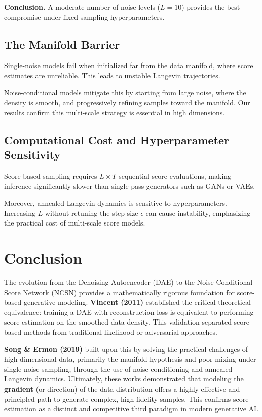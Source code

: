 \documentclass[11pt,a4paper]{article}
\begin{document}
\textbf{Conclusion.}
A moderate number of noise levels ($L=10$) provides the best compromise under fixed sampling hyperparameters.

\subsection{The Manifold Barrier}

Single-noise models fail when initialized far from the data manifold, where score estimates are unreliable.
This leads to unstable Langevin trajectories.

Noise-conditional models mitigate this by starting from large noise, where the density is smooth, and progressively refining samples toward the manifold.
Our results confirm this multi-scale strategy is essential in high dimensions.

\subsection{Computational Cost and Hyperparameter Sensitivity}

Score-based sampling requires $L\times T$ sequential score evaluations, making inference significantly slower than single-pass generators such as GANs or VAEs.

Moreover, annealed Langevin dynamics is sensitive to hyperparameters.
Increasing $L$ without retuning the step size $\epsilon$ can cause instability, emphasizing the practical cost of multi-scale score models.



\section{Conclusion}

The evolution from the Denoising Autoencoder (DAE) to the Noise-Conditional Score Network (NCSN) provides a mathematically rigorous foundation for score-based generative modeling. \textbf{Vincent (2011)} established the critical theoretical equivalence: training a DAE with reconstruction loss is equivalent to performing score estimation on the smoothed data density. This validation separated score-based methods from traditional likelihood or adversarial approaches.

\textbf{Song \& Ermon (2019)} built upon this by solving the practical challenges of high-dimensional data, primarily the manifold hypothesis and poor mixing under single-noise sampling, through the use of noise-conditioning and annealed Langevin dynamics. Ultimately, these works demonstrated that modeling the \textbf{gradient} (or direction) of the data distribution offers a highly effective and principled path to generate complex, high-fidelity samples. This confirms score estimation as a distinct and competitive third paradigm in modern generative AI.
\end{document}
